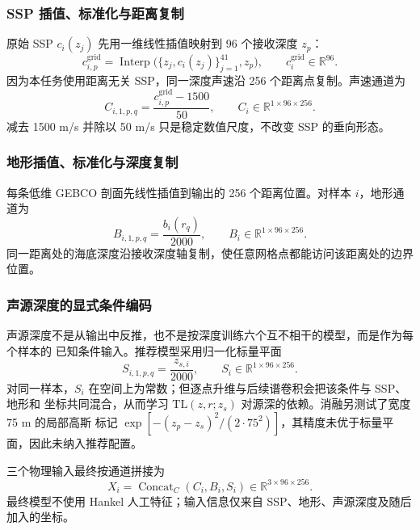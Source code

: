 \documentclass[UTF8,11pt]{ctexart}
\newcommand{\TL}{\mathrm{TL}}
\begin{document}
\subsubsection{SSP 插值、标准化与距离复制}

原始 SSP $c_i(z_j)$ 先用一维线性插值映射到 96 个接收深度 $z_p$：
\begin{equation}
  c^{\mathrm{grid}}_{i,p}=\operatorname{Interp}
  \big(\{z_j,c_i(z_j)\}_{j=1}^{41},z_p\big),
  \qquad c^{\mathrm{grid}}_i\in\mathbb{R}^{96}.
\end{equation}
因为本任务使用距离无关 SSP，同一深度声速沿 256 个距离点复制。声速通道为
\begin{equation}
  C_{i,1,p,q}=\frac{c^{\mathrm{grid}}_{i,p}-1500}{50},\qquad
  C_i\in\mathbb{R}^{1\times96\times256}.
\end{equation}
减去 1500 m/s 并除以 50 m/s 只是稳定数值尺度，不改变 SSP 的垂向形态。

\subsubsection{地形插值、标准化与深度复制}

每条低维 GEBCO 剖面先线性插值到输出的 256 个距离位置。对样本 $i$，地形通道为
\begin{equation}
  B_{i,1,p,q}=\frac{b_i(r_q)}{2000},\qquad
  B_i\in\mathbb{R}^{1\times96\times256}.
\end{equation}
同一距离处的海底深度沿接收深度轴复制，使任意网格点都能访问该距离处的边界位置。
\subsubsection{声源深度的显式条件编码}

声源深度不是从输出中反推，也不是按深度训练六个互不相干的模型，而是作为每个样本的
已知条件输入。推荐模型采用归一化标量平面
\begin{equation}
  S_{i,1,p,q}=\frac{z_{s,i}}{2000},\qquad
  S_i\in\mathbb{R}^{1\times96\times256}.
\end{equation}
对同一样本，$S_i$ 在空间上为常数；但逐点升维与后续谱卷积会把该条件与 SSP、地形和
坐标共同混合，从而学习 $\TL(z,r;z_s)$ 对源深的依赖。消融另测试了宽度 75 m 的局部高斯
标记 $\exp[-(z_p-z_s)^2/(2\cdot75^2)]$，其精度未优于标量平面，因此未纳入推荐配置。

三个物理输入最终按通道拼接为
\begin{equation}
  X_i=\operatorname{Concat}_{C}(C_i,B_i,S_i)
  \in\mathbb{R}^{3\times96\times256}.
\end{equation}
最终模型不使用 Hankel 人工特征；输入信息仅来自 SSP、地形、声源深度及随后加入的坐标。
\end{document}
